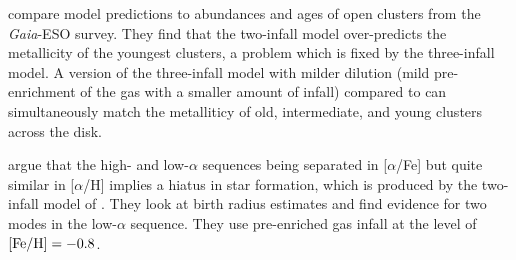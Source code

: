 \citet{palla_mapping_2024} compare model predictions to abundances and ages of open clusters from the {\it Gaia}-ESO survey. They find that the two-infall model over-predicts the metallicity of the youngest clusters, a problem which is fixed by the three-infall model. A version of the three-infall model with milder dilution (mild pre-enrichment of the gas with a smaller amount of infall) compared to \citet{spitoni_beyond_2023} can simultaneously match the metalliticy of old, intermediate, and young clusters across the disk.

\citet{spitoni_remind_2024} argue that the high- and low-$\alpha$ sequences being separated in [$\alpha$/Fe] but quite similar in [$\alpha$/H] implies a hiatus in star formation, which is produced by the two-infall model of \citet{spitoni_galactic_2019}. They look at birth radius estimates and find evidence for two modes in the low-$\alpha$ sequence. They use pre-enriched gas infall at the level of $\rm{[Fe/H]}=-0.8$.
